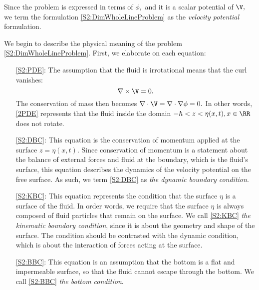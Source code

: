 Since the problem is expressed in terms of $\phi,$ and it is a scalar potential of $\V,$ we term the formulation \eqref{S2:DimWholeLineProblem} as the \textit{velocity potential} formulation.

We begin to describe the physical meaning of the problem \eqref{S2:DimWholeLineProblem}. First, we elaborate on each equation:
\begin{itemize}
\item[\eqref{S2:PDE}:] The assumption that the fluid is irrotational means that the curl vanishes:
\[ \nabla \times \V = 0. \]
The conservation of mass then becomes $ \nabla \cdot \V = \nabla \cdot \nabla \phi = 0.$ In other words, \eqref{2PDE} represents that the fluid inside the domain $-h < z < \eta(x,t), x \in \RR$ does not rotate.  
\item[\eqref{S2:DBC}:] This equation is the conservation of momentum applied at the surface $z = \eta(x,t).$ Since conservation of momentum is a statement about the balance of external forces and fluid at the boundary, which is the fluid's surface, this equation describes the dynamics of the velocity potential on the free surface. As such, we term \eqref{S2:DBC} as \textit{the dynamic boundary condition}.
\item[\eqref{S2:KBC}:] This equation represents the condition that the surface $\eta$ is a surface of the fluid. In order words, we require that the surface $\eta$ is always composed of 
fluid particles that remain on the surface. We call \eqref{S2:KBC} \textit{the kinematic boundary condition}, since it is about the geometry and shape of the surface. The condition should be contrasted with the dynamic condition, which is about the interaction of forces acting at the surface. 
\item[\eqref{S2:BBC}:] This equation is an assumption that the bottom is a flat and impermeable surface, so that the fluid cannot escape through the bottom. We call \eqref{S2:BBC} \textit{the bottom condition}. 
\end{itemize}

